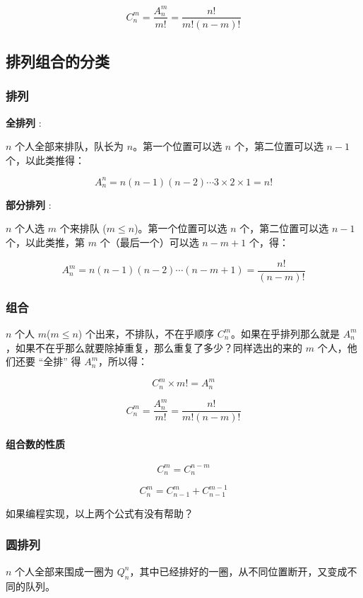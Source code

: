 $$
C_n^m = \frac{A_n^m}{m!} = \frac{n!}{m!(n - m)!}
$$

\subsection{排列组合的分类}

\subsubsection{排列}

\textbf{ 全排列 }:

$n$ 个人全部来排队，队长为 $n$。第一个位置可以选 $n$ 个，第二位置可以选 $n-1$ 个，以此类推得：

$$
A_n^n = n(n-1)(n-2) \cdots 3 × 2 × 1 = n!
$$

\textbf{ 部分排列 }:

$n$ 个人选 $m$ 个来排队 ($m \le n$)。第一个位置可以选 $n$ 个，第二位置可以选 $n-1$ 个，以此类推，第 $m$ 个（最后一个）可以选 $n-m+1$ 个，得：

$$
A_n^m = n(n-1)(n-2) \cdots (n-m+1) = \frac{n!}{(n - m)!}
$$

\subsubsection{组合}

$n$ 个人 $m$($m \le n$) 个出来，不排队，不在乎顺序 $C_n^m$。如果在乎排列那么就是 $A_n^m$，如果不在乎那么就要除掉重复，那么重复了多少？同样选出的来的 $m$ 个人，他们还要 “全排” 得 $A_n^m$，所以得：

$$
C_n^m \times m! = A_n^m
$$

$$
C_n^m = \frac{A_n^m}{m!} = \frac{n!}{m!(n-m)!}
$$

\paragraph{组合数的性质}

$$
C_n^m = C_{n}^{n-m}
$$

$$
C_n^m = C_{n-1}^{m} + C_{n-1}^{m-1}
$$

如果编程实现，以上两个公式有没有帮助？

\subsubsection{圆排列}

$n$ 个人全部来围成一圈为 $Q_n^n$，其中已经排好的一圈，从不同位置断开，又变成不同的队列。

